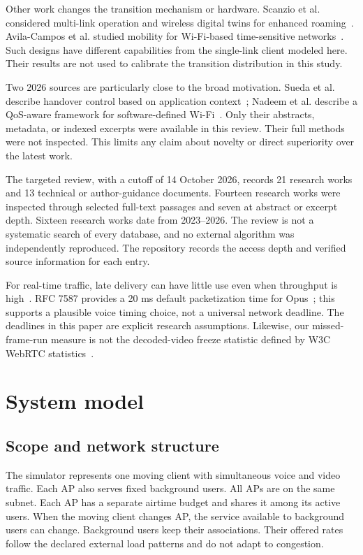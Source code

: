 \documentclass[11pt,a4paper]{article}
\begin{document}
Other work changes the transition mechanism or hardware. Scanzio et al. considered multi-link operation and wireless digital twins for enhanced roaming~\cite{R07}. Avila-Campos et al. studied mobility for Wi-Fi-based time-sensitive networks~\cite{M06}. Such designs have different capabilities from the single-link client modeled here. Their results are not used to calibrate the transition distribution in this study.

Two 2026 sources are particularly close to the broad motivation. Sueda et al. describe handover control based on application context~\cite{R01}; Nadeem et al. describe a QoS-aware framework for software-defined Wi-Fi~\cite{R02}. Only their abstracts, metadata, or indexed excerpts were available in this review. Their full methods were not inspected. This limits any claim about novelty or direct superiority over the latest work.

The targeted review, with a cutoff of 14 October 2026, records 21 research works and 13 technical or author-guidance documents. Fourteen research works were inspected through selected full-text passages and seven at abstract or excerpt depth. Sixteen research works date from 2023--2026. The review is not a systematic search of every database, and no external algorithm was independently reproduced. The repository records the access depth and verified source information for each entry.

For real-time traffic, late delivery can have little use even when throughput is high~\cite{P01}. RFC 7587 provides a 20 ms default packetization time for Opus~\cite{P02}; this supports a plausible voice timing choice, not a universal network deadline. The deadlines in this paper are explicit research assumptions. Likewise, our missed-frame-run measure is not the decoded-video freeze statistic defined by W3C WebRTC statistics~\cite{M12}.

\section{System model}
\subsection{Scope and network structure}
The simulator represents one moving client with simultaneous voice and video traffic. Each AP also serves fixed background users. All APs are on the same subnet. Each AP has a separate airtime budget and shares it among its active users. When the moving client changes AP, the service available to background users can change. Background users keep their associations. Their offered rates follow the declared external load patterns and do not adapt to congestion.
\end{document}
